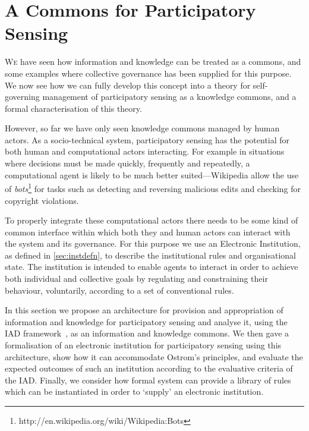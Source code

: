 \acresetall
\chapter{A Commons for Participatory Sensing}\label{sec:iad}



\lettrine[lines=3]{W}{e} have seen how information and knowledge can be treated as a commons, and
some examples where collective governance has been supplied for this purpose.
We now see how we can fully develop this concept into a theory for self-
governing management of participatory sensing as a knowledge commons, and a
formal characterisation of this theory.

However, so far we have only seen knowledge commons managed by human actors.
As a socio-technical system, participatory sensing has the potential for both
human and computational actors interacting.  For example in situations where
decisions must be made quickly, frequently and repeatedly, a computational
agent is likely to be much better suited---Wikipedia allow the use of
\emph{bots}\footnote{http://en.wikipedia.org/wiki/Wikipedia:Bots} for tasks
such as detecting and reversing malicious edits and checking for copyright
violations.

To properly integrate these computational actors there needs to be
some kind of common interface within which both they and human actors can
interact with the system and its governance. For this purpose we use an
Electronic Institution, as defined in \autoref{sec:instdefn}, to describe the
institutional rules and organisational state. The institution is intended to
enable agents to interact in order to achieve both individual and collective
goals by regulating and constraining their behaviour, voluntarily, according
to a set of conventional rules.

In this section we propose an architecture for provision and appropriation of information and knowledge for participatory sensing and analyse it, using the \ac{IAD} framework~\citep{Ostrom2005}, as an information and knowledge commons.
We then gave a formalisation of an electronic institution for participatory sensing using this architecture, show how it can accommodate Ostrom's principles,
and evaluate the expected outcomes of such an institution according to the evaluative criteria of the \ac{IAD}.
Finally, we consider how formal system can provide a library of rules which can be instantiated in order to `supply' an electronic institution. 

